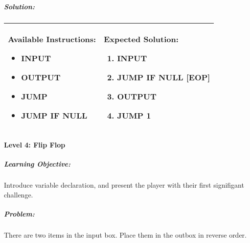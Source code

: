 \subparagraph{Solution:} 
\begin{center}
    \begin{tabular}{ | m{5cm} | m{9cm} | } 
        \hline
            \textbf{Available Instructions:} 
            \begin{itemize}
                \setlength\itemsep{-.35em}
                \item INPUT
                \item OUTPUT
                \item JUMP
                \item JUMP IF NULL
            \end{itemize}& 
            \textbf{Expected Solution:} 
            \begin{enumerate}
                \setlength\itemsep{-.35em}
                \item INPUT
                \item JUMP IF NULL [EOP]
                \item OUTPUT
                \item JUMP 1
            \end{enumerate}
            \\
        \hline
    \end{tabular}
\end{center}

\paragraph{Level 4: Flip Flop}
\subparagraph{Learning Objective:} Introduce variable declaration, and present the player with their first signifigant challenge.

\subparagraph{Problem:} There are two items in the input box. Place them in the outbox in reverse order.

